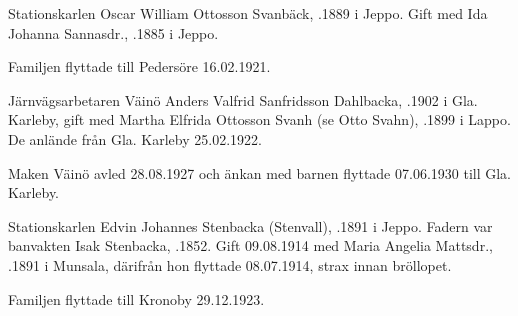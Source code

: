 {Stationskarlen Oscar William Ottosson Svanbäck, .1889 i Jeppo. Gift med Ida Johanna Sannasdr., .1885 i Jeppo.
\begin{jhchildren}
  \item {}
  \item {}
  \item {}
  \item {}
  \item {}
  \item {}
  \item {}
\end{jhchildren}
Familjen flyttade till Pedersöre 16.02.1921.


Järnvägsarbetaren Väinö Anders Valfrid Sanfridsson Dahlbacka, .1902 i Gla. Karleby, gift med Martha Elfrida Ottosson Svanh (se Otto Svahn), .1899 i Lappo. De anlände från Gla. Karleby 25.02.1922.
\begin{jhchildren}
  \item {}
  \item {}
  \item {}
\end{jhchildren}
Maken Väinö avled 28.08.1927 och änkan med barnen flyttade 07.06.1930 till Gla. Karleby.


Stationskarlen Edvin Johannes Stenbacka (Stenvall), .1891 i Jeppo. Fadern var banvakten Isak Stenbacka, .1852. Gift 09.08.1914 med Maria Angelia Mattsdr., .1891 i Munsala, därifrån hon flyttade 08.07.1914, strax innan bröllopet.
\begin{jhchildren}
  \item {}
  \item {}
  \item {}
  \item {}
\end{jhchildren}
Familjen flyttade till Kronoby 29.12.1923.


}
